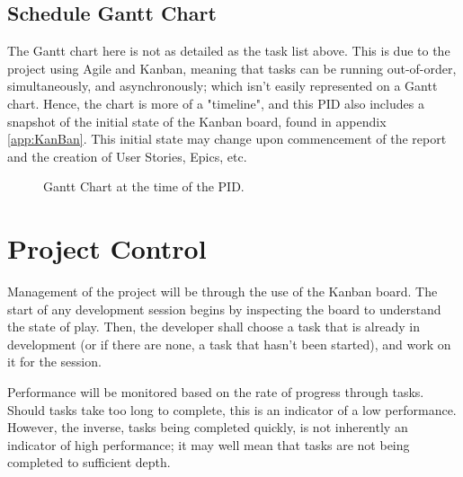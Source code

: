 \documentclass[11pt, a4paper, notitlepage]{report}
\begin{document}
\subsection{Schedule Gantt Chart}\label{subsec:schedGanttCt}
The Gantt chart here is not as detailed as the task list above. This is due to 
the project using Agile and Kanban, meaning that tasks can be running 
out-of-order, simultaneously, and asynchronously; which isn't easily 
represented on a Gantt chart. Hence, the chart is more of a "timeline", and 
this PID also includes a snapshot of the initial state of the Kanban board, 
found in appendix \ref{app:KanBan}. This initial state may change upon 
commencement of the report and the creation of User Stories, Epics, etc.
\begin{landscape}
    \begin{figure}[h]
        \centering
        \caption{Gantt Chart at the time of the PID.}
        \label{fig:ganttchart}
    \end{figure}
\end{landscape}

\section{Project Control}
Management of the project will be through the use of the Kanban board. The 
start of any development session begins by inspecting the board to understand 
the state of play. Then, the developer shall choose a task that is already in 
development (or if there are none, a task that hasn't been started), and work 
on it for the session.

Performance will be monitored based on the rate of progress through tasks. 
Should tasks take too long to complete, this is an indicator of a low 
performance. However, the inverse, tasks being completed quickly, is not 
inherently an indicator of high performance; it may well mean that tasks are 
not being completed to sufficient depth.
\end{document}
